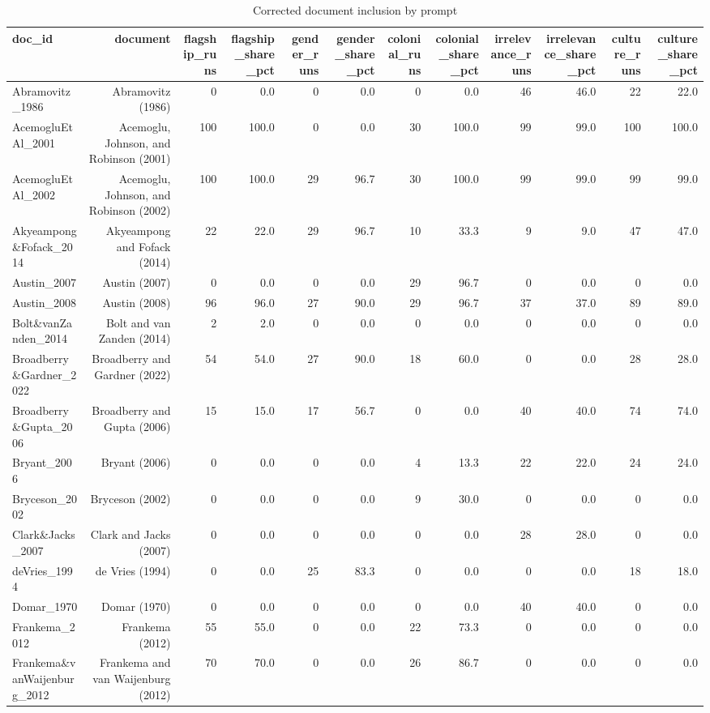 \begin{table}[ht]
\centering
\caption{Corrected document inclusion by prompt}
\scriptsize
\begin{tabular}{lrrrrrrrrrrr}
\toprule
doc\_id & document & flagship\_runs & flagship\_share\_pct & gender\_runs & gender\_share\_pct & colonial\_runs & colonial\_share\_pct & irrelevance\_runs & irrelevance\_share\_pct & culture\_runs & culture\_share\_pct \\
\midrule
Abramovitz\_1986 & Abramovitz (1986) & 0 & 0.0 & 0 & 0.0 & 0 & 0.0 & 46 & 46.0 & 22 & 22.0 \\
AcemogluEtAl\_2001 & Acemoglu, Johnson, and Robinson (2001) & 100 & 100.0 & 0 & 0.0 & 30 & 100.0 & 99 & 99.0 & 100 & 100.0 \\
AcemogluEtAl\_2002 & Acemoglu, Johnson, and Robinson (2002) & 100 & 100.0 & 29 & 96.7 & 30 & 100.0 & 99 & 99.0 & 99 & 99.0 \\
Akyeampong\&Fofack\_2014 & Akyeampong and Fofack (2014) & 22 & 22.0 & 29 & 96.7 & 10 & 33.3 & 9 & 9.0 & 47 & 47.0 \\
Austin\_2007 & Austin (2007) & 0 & 0.0 & 0 & 0.0 & 29 & 96.7 & 0 & 0.0 & 0 & 0.0 \\
Austin\_2008 & Austin (2008) & 96 & 96.0 & 27 & 90.0 & 29 & 96.7 & 37 & 37.0 & 89 & 89.0 \\
Bolt\&vanZanden\_2014 & Bolt and van Zanden (2014) & 2 & 2.0 & 0 & 0.0 & 0 & 0.0 & 0 & 0.0 & 0 & 0.0 \\
Broadberry\&Gardner\_2022 & Broadberry and Gardner (2022) & 54 & 54.0 & 27 & 90.0 & 18 & 60.0 & 0 & 0.0 & 28 & 28.0 \\
Broadberry\&Gupta\_2006 & Broadberry and Gupta (2006) & 15 & 15.0 & 17 & 56.7 & 0 & 0.0 & 40 & 40.0 & 74 & 74.0 \\
Bryant\_2006 & Bryant (2006) & 0 & 0.0 & 0 & 0.0 & 4 & 13.3 & 22 & 22.0 & 24 & 24.0 \\
Bryceson\_2002 & Bryceson (2002) & 0 & 0.0 & 0 & 0.0 & 9 & 30.0 & 0 & 0.0 & 0 & 0.0 \\
Clark\&Jacks\_2007 & Clark and Jacks (2007) & 0 & 0.0 & 0 & 0.0 & 0 & 0.0 & 28 & 28.0 & 0 & 0.0 \\
deVries\_1994 & de Vries (1994) & 0 & 0.0 & 25 & 83.3 & 0 & 0.0 & 0 & 0.0 & 18 & 18.0 \\
Domar\_1970 & Domar (1970) & 0 & 0.0 & 0 & 0.0 & 0 & 0.0 & 40 & 40.0 & 0 & 0.0 \\
Frankema\_2012 & Frankema (2012) & 55 & 55.0 & 0 & 0.0 & 22 & 73.3 & 0 & 0.0 & 0 & 0.0 \\
Frankema\&vanWaijenburg\_2012 & Frankema and van Waijenburg (2012) & 70 & 70.0 & 0 & 0.0 & 26 & 86.7 & 0 & 0.0 & 0 & 0.0 \\

\end{tabular}
\end{table}

